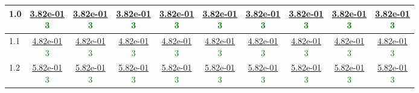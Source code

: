 \begin{table}[H]
\begin{tabular}{|l||c|c|c|c|c|c|c|c|c|}
\hline
 1.0 & \makecell{\ul{3.82e-01} \\ \textcolor{Green}{3}} & \makecell{\ul{3.82e-01} \\ \textcolor{Green}{3}} & \makecell{\ul{3.82e-01} \\ \textcolor{Green}{3}} & \makecell{\ul{3.82e-01} \\ \textcolor{Green}{3}} & \makecell{\ul{3.82e-01} \\ \textcolor{Green}{3}} & \makecell{\ul{3.82e-01} \\ \textcolor{Green}{3}} & \makecell{\ul{3.82e-01} \\ \textcolor{Green}{3}} & \makecell{\ul{3.82e-01} \\ \textcolor{Green}{3}} & \makecell{\ul{3.82e-01} \\ \textcolor{Green}{3}} \\
\hline
 1.1 & \makecell{\ul{4.82e-01} \\ \textcolor{Green}{3}} & \makecell{\ul{4.82e-01} \\ \textcolor{Green}{3}} & \makecell{\ul{4.82e-01} \\ \textcolor{Green}{3}} & \makecell{\ul{4.82e-01} \\ \textcolor{Green}{3}} & \makecell{\ul{4.82e-01} \\ \textcolor{Green}{3}} & \makecell{\ul{4.82e-01} \\ \textcolor{Green}{3}} & \makecell{\ul{4.82e-01} \\ \textcolor{Green}{3}} & \makecell{\ul{4.82e-01} \\ \textcolor{Green}{3}} & \makecell{\ul{4.82e-01} \\ \textcolor{Green}{3}} \\
\hline
 1.2 & \makecell{\ul{5.82e-01} \\ \textcolor{Green}{3}} & \makecell{\ul{5.82e-01} \\ \textcolor{Green}{3}} & \makecell{\ul{5.82e-01} \\ \textcolor{Green}{3}} & \makecell{\ul{5.82e-01} \\ \textcolor{Green}{3}} & \makecell{\ul{5.82e-01} \\ \textcolor{Green}{3}} & \makecell{\ul{5.82e-01} \\ \textcolor{Green}{3}} & \makecell{\ul{5.82e-01} \\ \textcolor{Green}{3}} & \makecell{\ul{5.82e-01} \\ \textcolor{Green}{3}} & \makecell{\ul{5.82e-01} \\ \textcolor{Green}{3}} \\

\end{tabular}
\end{table}
